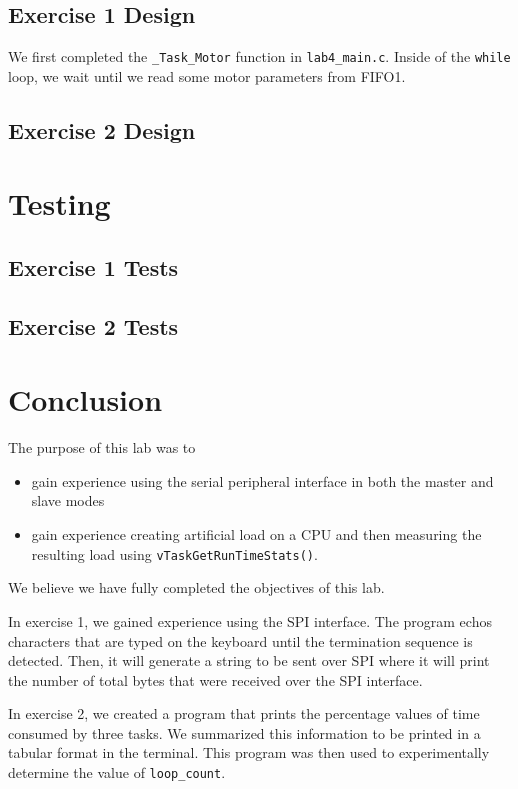 \documentclass[11pt, letterpaper, titlepage]{article}
\begin{document}
\subsection{Exercise 1 Design}
We first completed the \texttt{_Task_Motor} function in \texttt{lab4_main.c}. Inside of the \texttt{while} loop, we wait until we read some motor parameters from FIFO1.

\subsection{Exercise 2 Design}


\section{Testing}

\subsection{Exercise 1 Tests}

\subsection{Exercise 2 Tests}

\section{Conclusion}
The purpose of this lab was to 
\begin{itemize}
  \item gain experience using the serial peripheral interface in both the master and slave modes
  \item gain experience creating artificial load on a CPU and then measuring the resulting load using \texttt{vTaskGetRunTimeStats()}.
\end{itemize}

We believe we have fully completed the objectives of this lab.

In exercise 1, we gained experience using the SPI interface. The program echos characters that are typed on the keyboard until the termination sequence is detected. Then, it will generate a string to be sent over SPI where it will print the number of total bytes that were received over the SPI interface.

In exercise 2, we created a program that prints the percentage values of time consumed by three tasks. We summarized this information to be printed in a tabular format in the terminal. This program was then used to experimentally determine the value of \texttt{loop_count}.
\end{document}
